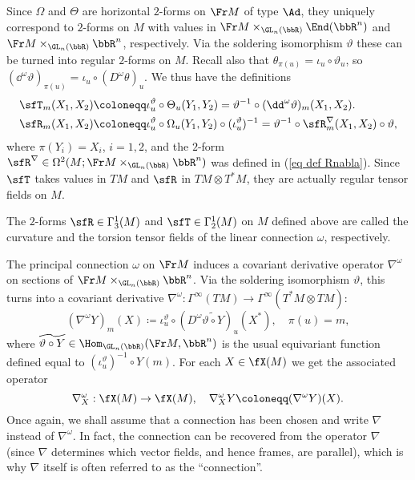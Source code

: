 Since $\Omega$ and $\Theta$ are horizontal $2$-forms on $\Fr M$ of type $\Ad$, they uniquely correspond to $2$-forms on $M$ with values in $\Fr M\times_{\GL_n(\bbR)}\End(\bbR^n)$ and $\Fr M\times_{\GL_n(\bbR)}\bbR^n$, respectively. Via the soldering isomorphism $\vartheta$ these can be turned into regular $2$-forms on $M$. Recall also that $\theta_{\pi(u)}=\iota_u\circ \vartheta_u$, so $(\dd^\omega \vartheta)_{\pi(u)}=\iota_u\circ (D^\omega\theta)_u$. We thus have the definitions
\begin{align}
    \sfT_m(X_1,X_2)\coloneqq &\iota_u^\vartheta\circ \Theta_u(Y_1,Y_2)=\vartheta^{-1}\circ (\dd^\omega \vartheta)_m(X_1,X_2).\\
    \sfR_m(X_1,X_2)\coloneqq & \iota_u^\vartheta\circ \Omega_u(Y_1,Y_2)\circ (\iota_u^\vartheta)^{-1}=\vartheta^{-1}\circ \sfR^\nabla_m(X_1,X_2)\circ \vartheta,
\end{align}
where $\pi(Y_i)=X_i$, $i=1,2$, and the $2$-form $\sfR^\nabla\in\Omega^2(M;\Fr M\times_{\GL_n(\bbR)}\bbR^n)$ was defined in (\ref{eq def Rnabla}). Since $\sfT$ takes values in $TM$ and $\sfR$ in $TM\otimes T^\ast M$, they are actually regular tensor fields on $M$.

\begin{defn}
    The $2$-forms $\sfR\in \Gamma_3^1(M)$ and $\sfT\in\Gamma_2^1(M)$ on $M$ defined above are called the curvature and the torsion tensor fields of the linear connection $\omega$, respectively.
\end{defn}


The principal connection $\omega$ on $\Fr M$ induces a covariant derivative operator $\nabla^\omega$ on sections of $\Fr M\times_{\GL_n(\bbR)}\bbR^n$. Via the soldering isomorphism $\vartheta$, this turns into a covariant derivative $\nabla^\omega:\Gamma^\infty(TM)\to \Gamma^\infty(T^\ast M\otimes TM)$:
\[(\nabla^\omega Y)_m(X)\coloneqq \iota_u^\vartheta\circ (D^\omega \widetilde{\vartheta\circ Y})_u(X^\ast),\quad \pi(u)=m,\]
where $\widetilde{\vartheta\circ Y}\in\Hom_{\GL_n(\bbR)}(\Fr M,\bbR^n)$ is the usual equivariant function defined equal to $(\iota_u^\vartheta)^{-1}\circ Y(m)$. For each $X\in\fX(M)$ we get the associated operator
\[\nabla_X^\omega:\fX(M)\to \fX(M),\quad \nabla_X^\omega Y\coloneqq (\nabla^\omega Y)(X).\]
Once again, we shall assume that a connection has been chosen and write $\nabla$ instead of $\nabla^\omega$. In fact, the connection can be recovered from the operator $\nabla$ (since $\nabla$ determines which vector fields, and hence frames, are parallel), which is why $\nabla$ itself is often referred to as the ``connection''.

